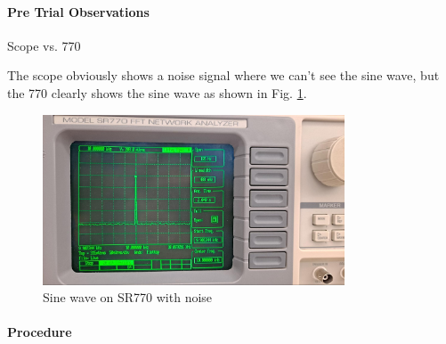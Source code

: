\documentclass[../main.tex]{subfiles}
\begin{document}
\paragraph*{Pre Trial Observations} Scope vs. 770

The scope obviously shows a noise signal where we can't see the sine wave, but the 770 clearly shows the sine wave as shown in Fig. \ref{fig:1.8}.

\begin{figure}[ht]
    \centering
    \includegraphics[width=0.8\textwidth]{fig1_8.jpg}
    \caption{Sine wave on SR770 with noise}
    \label{fig:1.8}
\end{figure}

\newpage
\paragraph*{Procedure}
\end{document}
